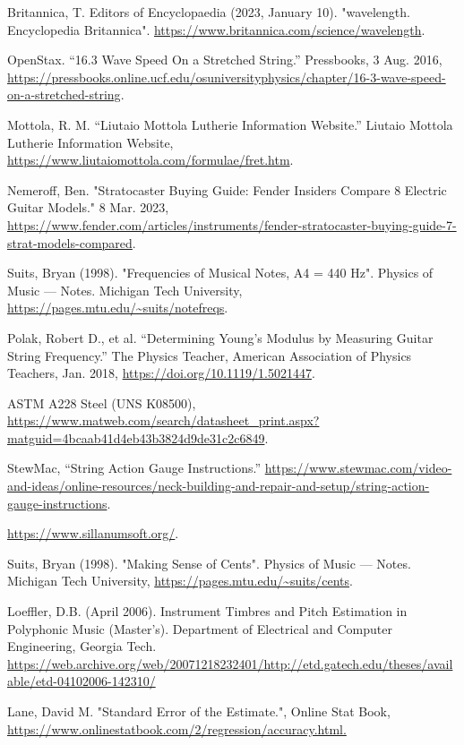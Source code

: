 \documentclass[11pt]{article}
\begin{document}
\begin{flushleft}
        \begin{thebibliography}{15}

             Britannica, T. Editors of Encyclopaedia (2023, January 10). "wavelength. Encyclopedia Britannica". \url{https://www.britannica.com/science/wavelength}.
            
             OpenStax. “16.3 Wave Speed On a Stretched String.” Pressbooks, 3 Aug. 2016, \url{https://pressbooks.online.ucf.edu/osuniversityphysics/chapter/16-3-wave-speed-on-a-stretched-string}.
    
             Mottola, R. M. “Liutaio Mottola Lutherie Information Website.” Liutaio Mottola Lutherie Information Website, \url{https://www.liutaiomottola.com/formulae/fret.htm}.
    
             Nemeroff, Ben. "Stratocaster Buying Guide: Fender Insiders Compare 8 Electric Guitar Models." 8 Mar. 2023, \url{https://www.fender.com/articles/instruments/fender-stratocaster-buying-guide-7-strat-models-compared}.
    
             Suits, Bryan (1998). "Frequencies of Musical Notes, A4 = 440 Hz". Physics of Music — Notes. Michigan Tech University, \url{https://pages.mtu.edu/~suits/notefreqs}.
            
             Polak, Robert D., et al. “Determining Young’s Modulus by Measuring Guitar String Frequency.” The Physics Teacher, American Association of Physics Teachers, Jan. 2018, \url{https://doi.org/10.1119/1.5021447}.
    
             ASTM A228 Steel (UNS K08500), \url{https://www.matweb.com/search/datasheet_print.aspx?matguid=4bcaab41d4eb43b3824d9de31c2c6849}.
    
             StewMac, “String Action Gauge Instructions.” \url{https://www.stewmac.com/video-and-ideas/online-resources/neck-building-and-repair-and-setup/string-action-gauge-instructions}.
    
             \url{https://www.sillanumsoft.org/}.
    
             Suits, Bryan (1998). "Making Sense of Cents". Physics of Music — Notes. Michigan Tech University, \url{https://pages.mtu.edu/~suits/cents}.
    
             Loeffler, D.B. (April 2006). Instrument Timbres and Pitch Estimation in Polyphonic Music (Master's). Department of Electrical and Computer Engineering, Georgia Tech. \url{https://web.archive.org/web/20071218232401/http://etd.gatech.edu/theses/available/etd-04102006-142310/}
    
             Lane, David M. "Standard Error of the Estimate.", Online Stat Book, \url{https://www.onlinestatbook.com/2/regression/accuracy.html.}
    
        \end{thebibliography}

    \end{flushleft}
\end{document}

